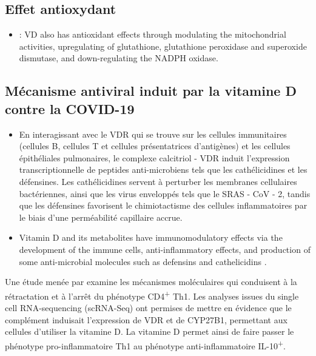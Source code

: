 \documentclass[
  a4paper,
  DIV=11,
  numbers=noendperiod,
  listof=totoc]{scrreprt}
\providecommand{\tightlist}{%
  \setlength{\itemsep}{0pt}\setlength{\parskip}{0pt}}\usepackage{longtable,booktabs,array}
\begin{document}
\subsection{Effet antioxydant}\label{effet-antioxydant}

\begin{itemize}
\tightlist
\item
  \textcite{Shiravi.2022} : VD also has antioxidant effects through
  modulating the mitochondrial activities, upregulating of glutathione,
  glutathione peroxidase and superoxide dismutase, and down-regulating
  the NADPH oxidase.
\end{itemize}

\subsection{Mécanisme antiviral induit par la vitamine D contre la
COVID-19}\label{muxe9canisme-antiviral-induit-par-la-vitamine-d-contre-la-covid-19}

\begin{itemize}
\item
  En interagissant avec le VDR qui se trouve sur les cellules
  immunitaires (cellules B, cellules T et cellules présentatrices
  d'antigènes) et les cellules épithéliales pulmonaires, le complexe
  calcitriol - VDR induit l'expression transcriptionnelle de peptides
  anti-microbiens tels que les cathélicidines et les défensines. Les
  cathélicidines servent à perturber les membranes cellulaires
  bactériennes, ainsi que les virus enveloppés tels que le SRAS - CoV -
  2, tandis que les défensines favorisent le chimiotactisme des cellules
  inflammatoires par le biais d'une perméabilité capillaire accrue.
  \autocite{Munshi.2021}
\item
  Vitamin D and its metabolites have immunomodulatory effects via the
  development of the immune cells, anti-inflammatory effects, and
  production of some anti-microbial molecules such as defensins and
  cathelicidins \autocite{Shiravi.2022}.
\end{itemize}

Une étude menée par \textcite{Chauss.2022} examine les mécanismes
moléculaires qui conduisent à la rétractation et à l'arrêt du phénotype
CD4\textsuperscript{+} \ac{Th1}. Les analyses issues du single cell
RNA-sequencing (scRNA-Seq) ont permises de mettre en évidence que le
complément induisait l'expression de \ac{VDR} et de \ac{CYP27B1},
permettant aux cellules d'utiliser la vitamine D. La vitamine D permet
ainsi de faire passer le phénotype pro-inflammatoire \ac{Th1} au
phénotype anti-inflammatoire IL-10\textsuperscript{+}.
\end{document}
